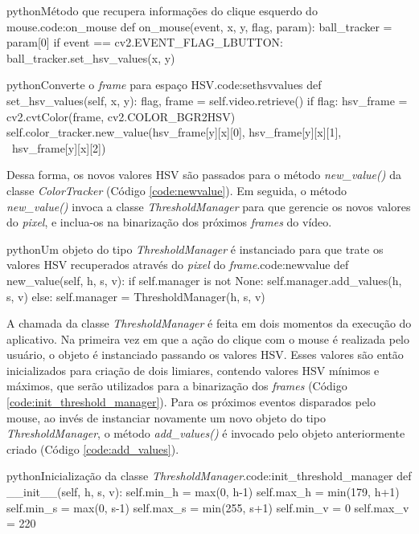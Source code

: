 \begin{code}{python}{Método que recupera informações do clique esquerdo do mouse.}{code:on_mouse}
def on_mouse(event, x, y, flag, param):
	ball_tracker = param[0]
	if event == cv2.EVENT_FLAG_LBUTTON:
		ball_tracker.set_hsv_values(x, y)
\end{code}

\begin{figure}[H]
\end{figure}

\begin{code}{python}{Converte o \textit{frame} para espaço HSV.}{code:sethsvvalues}
def set_hsv_values(self, x, y):
	flag, frame = self.video.retrieve()
	if flag:
		hsv_frame = cv2.cvtColor(frame, cv2.COLOR_BGR2HSV)
		self.color_tracker.new_value(hsv_frame[y][x][0], hsv_frame[y][x][1], \
			hsv_frame[y][x][2])
\end{code}

Dessa forma, os novos valores HSV são passados para o método \textit{new\_value()} da classe \textit{ColorTracker} (Código \ref{code:newvalue}). Em seguida, o método \textit{new\_value()} invoca a classe \textit{ThresholdManager} para que gerencie os novos valores do \textit{pixel}, e inclua-os na binarização dos próximos \textit{frames} do vídeo.

\begin{code}{python}{Um objeto do tipo \textit{ThresholdManager} é instanciado para que trate os valores HSV recuperados através do \textit{pixel} do \textit{frame}.}{code:newvalue}
def new_value(self, h, s, v):
	if self.manager is not None:
		self.manager.add_values(h, s, v)
	else:
		self.manager = ThresholdManager(h, s, v)
\end{code}

A chamada da classe \textit{ThresholdManager} é feita em dois momentos da execução do aplicativo. Na primeira vez em que a ação do clique com o mouse é realizada pelo usuário, o objeto é instanciado passando os valores HSV. Esses valores são então inicializados para criação de dois limiares, contendo valores HSV mínimos e máximos, que serão utilizados para a binarização dos \textit{frames} (Código \ref{code:init_threshold_manager}). Para os próximos eventos disparados pelo mouse, ao invés de instanciar novamente um novo objeto do tipo \textit{ThresholdManager}, o método \textit{add\_values()} é invocado pelo objeto anteriormente criado (Código \ref{code:add_values}).

\begin{code}{python}{Inicialização da classe \textit{ThresholdManager}.}{code:init_threshold_manager}
def __init__(self, h, s, v):
	self.min_h = max(0, h-1)
	self.max_h = min(179, h+1)
	self.min_s = max(0, s-1)
	self.max_s = min(255, s+1)
	self.min_v = 0
	self.max_v = 220
\end{code}

